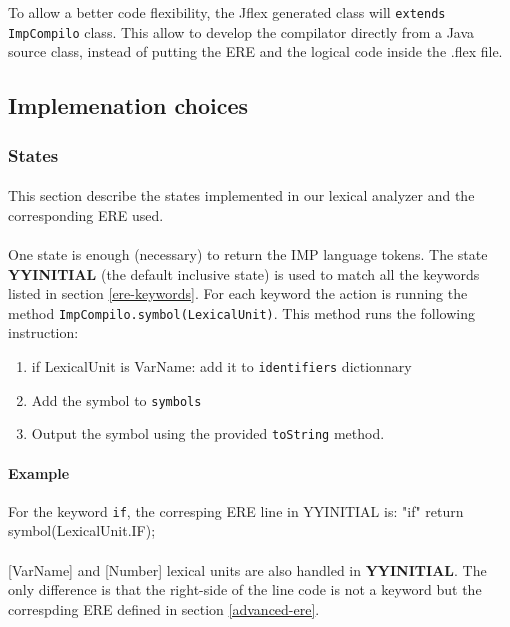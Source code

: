 \documentclass[letterpaper]{article}
\begin{document}
To allow a better code flexibility, the Jflex generated class will
\texttt{extends} \texttt{ImpCompilo} class. This allow to develop the
compilator directly from a Java source class, instead of putting the
ERE and the logical code inside the .flex file.

\subsection{Implemenation choices}

\subsubsection{States}

\paragraph{}

This section describe the states\cite{jflexdocstates} implemented in our
lexical analyzer and the corresponding ERE used.

\paragraph{}

One state is enough (necessary) to return the IMP language tokens.
The state \textbf{YYINITIAL} (the default inclusive state) is used to match
all the keywords listed in section \ref{ere-keywords}. For each keyword
the action is running the method \texttt{ImpCompilo.symbol(LexicalUnit)}.
This method runs the following instruction:
\begin{enumerate}
    \item if LexicalUnit is VarName: add it to \texttt{identifiers} dictionnary
    \item Add the symbol to \texttt{symbols}
    \item Output the symbol using the provided \texttt{toString} method.
\end{enumerate}
\paragraph{Example}

For the keyword \texttt{if}, the corresping ERE line in YYINITIAL is:
"if"             {return symbol(LexicalUnit.IF);}

\paragraph{}
[VarName] and [Number] lexical units are also handled in \textbf{YYINITIAL}.
The only difference is that the right-side of the line code is not a keyword
but the correspding ERE defined in section \ref{advanced-ere}.
\end{document}
